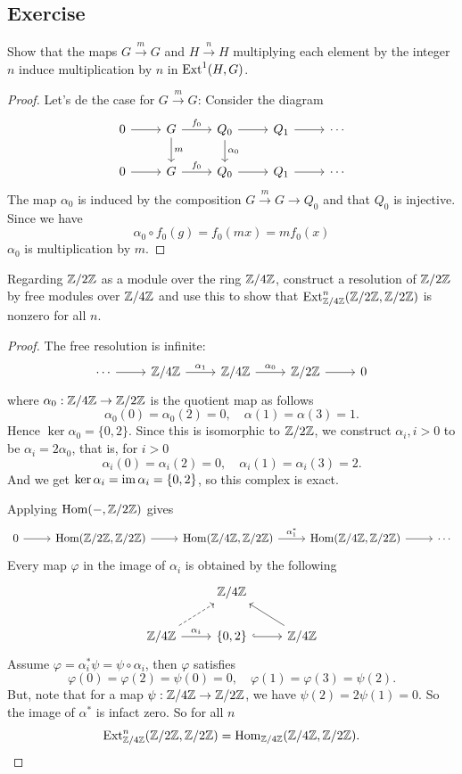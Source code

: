 \subsection{Exercise}
\begin{exercise}
Show that the maps $G\stackrel{m}{\longrightarrow}G$ and $H\stackrel{n}{\longrightarrow}H$ multiplying each element by the integer $n$ induce multiplication by $n$ in $\mathrm{Ext}^1(H,G)$.
\end{exercise}
\begin{proof}
Let's de the case for $G\stackrel{m}{\longrightarrow}G$: Consider the diagram
\[\begin{tikzcd}
0\ar[r]&G\ar[r,"f_0"]\ar[d,"m"]&Q_0\ar[r]\ar[d,"\alpha_0"]&Q_1\ar[r]&\cdots\\
0\ar[r]&G\ar[r,"f_0"]&Q_0\ar[r]&Q_1\ar[r]&\cdots
\end{tikzcd}\]
The map $\alpha_0$ is induced by the composition $G\stackrel{m}{\longrightarrow}G\to Q_0$ and that $Q_0$ is injective. Since we have
\[\alpha_0\circ f_0(g)=f_0(mx)=mf_0(x)\]
$\alpha_0$ is multiplication by $m$.
\end{proof}
\begin{exercise}
Regarding $\mathbb{Z}/2\mathbb{Z}$ as a module over the ring $\mathbb{Z}/4\mathbb{Z}$, construct a resolution of $\mathbb{Z}/2\mathbb{Z}$ by free modules over $\mathbb{Z}/4\mathbb{Z}$ and use this to show that $\mathrm{Ext}^n_{\mathbb{Z}/4\mathbb{Z}}(\mathbb{Z}/2\mathbb{Z},\mathbb{Z}/2\mathbb{Z})$ is nonzero for all $n$.
\end{exercise}
\begin{proof}
The free resolution is infinite:
\[\begin{tikzcd}
\cdots\ar[r]&\Z/4\Z\ar[r,"\alpha_1"]&\Z/4\Z\ar[r,"\alpha_0"]&\Z/2\Z\ar[r]&0
\end{tikzcd}\]
where $\alpha_0:\mathbb{Z}/4\mathbb{Z}\to\mathbb{Z}/2\mathbb{Z}$ is the quotient map as follows
\[\alpha_0(0)=\alpha_0(2)=0,\quad \alpha(1)=\alpha(3)=1.\]
Hence $\ker\alpha_0=\{0,2\}$. Since this is isomorphic to $\mathbb{Z}/2\mathbb{Z}$, we construct $\alpha_i, i>0$ to be $\alpha_i=2\alpha_0$, that is, for $i>0$
\[\alpha_i(0)=\alpha_i(2)=0,\quad\alpha_i(1)=\alpha_i(3)=2.\]
And we get $\mathrm{ker}\,\alpha_i=\mathrm{im}\,\alpha_i=\{0,2\}$, so this complex is exact.\par
Applying $\mathrm{Hom}(-,\mathbb{Z}/2\mathbb{Z})$ gives
\[\begin{tikzcd}
0\ar[r]&\Hom(\Z/2\Z,\Z/2\Z)\ar[r]&\Hom(\Z/4\Z,\Z/2\Z)\ar[r,"\alpha_1^*"]&\Hom(\Z/4\Z,\Z/2\Z)\ar[r]&\cdots
\end{tikzcd}\]
Every map $\varphi$ in the image of $\alpha_i$ is obtained by the following
\[\begin{tikzcd}
&\Z/4\Z&\\
\Z/4\Z\ar[ru,dashed]\ar[r,"\alpha_i"]&\{0,2\}\ar[r,hook]&\Z/4\Z\ar[lu]
\end{tikzcd}\]
Assume $\varphi=\alpha_i^*\psi=\psi\circ\alpha_i$, then $\varphi$ satisfies 
\[\varphi(0)=\varphi(2)=\psi(0)=0,\quad\varphi(1)=\varphi(3)=\psi(2).\]
But, note that for a map $\psi:\mathbb{Z}/4\mathbb{Z}\to\mathbb{Z}/2\mathbb{Z}$, we have $\psi(2)=2\psi(1)=0$. So the image of $\alpha^*$ is infact zero. So for all $n$ \[\mathrm{Ext}^n_{\mathbb{Z}/4\mathbb{Z}}(\mathbb{Z}/2\mathbb{Z},\mathbb{Z}/2\mathbb{Z})=\mathrm{Hom}_{\mathbb{Z}/4\mathbb{Z}}(\mathbb{Z}/4\mathbb{Z},\mathbb{Z}/2\mathbb{Z}).\]
\end{proof}

